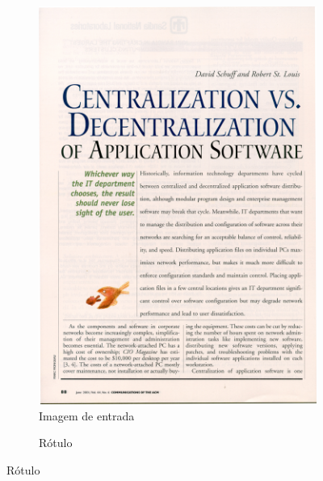 \documentclass{article}
\begin{document}
		\begin{figure}[H]			
			\caption[Conjunto de dados]
			{Conjunto de dados}
			\centering
			\begin{subfigure}[b]{150px}				
				\caption{Imagem de entrada}
				\includegraphics[width=\textwidth]{9.jpg}
			\end{subfigure}
			\qquad
			\begin{subfigure}[b]{150px}				
				\caption{Rótulo}

\end{subfigure}
\end{figure}
\end{document}
